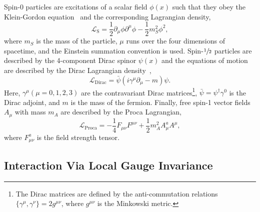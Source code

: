 Spin-0 particles are excitations of a scalar field $\phi(x)$ such that they obey the Klein-Gordon equation~\cite{Klein1926} and the corresponding Lagrangian density,
\begin{equation}
    \label{eq:scalar_lagrangian}
    \mathcal{L}_\text{S} = \frac{1}{2} \partial_\mu \phi \partial^\mu \phi - \frac{1}{2} m_S^2 \phi^2,
\end{equation}
where $m_S$ is the mass of the particle, $\mu$ runs over the four dimensions of spacetime, and the Einstein summation convention is used.
Spin-$\sfrac{1}{2}$ particles are described by the 4-component Dirac spinor $\psi(x)$ and the equations of motion are described by the Dirac Lagrangian density~\cite{Dirac1928},
\begin{equation}
    \label{eq:dirac_lagrangian}
    \mathcal{L}_\text{Dirac} = \bar{\psi} (i \gamma^\mu \partial_\mu - m) \psi.
\end{equation}
Here, $\gamma^\mu(\mu=0,1,2,3)$ are the contravariant Dirac matrices\footnote{The Dirac matrices are defined by the anti-commutation relations$\{ \gamma^\mu, \gamma^\nu \} = 2 g^{\mu\nu}$, where $g^{\mu\nu}$ is the Minkowski metric.}, $\bar{\psi} = \psi^\dagger \gamma^0$ is the Dirac adjoint, and $m$ is the mass of the fermion.
Finally, free spin-1 vector fields $A_\mu$ with mass $m_A$ are described by the Proca Lagrangian,
\begin{equation}
    \label{eq:proca_lagrangian}
    \mathcal{L}_\text{Proca} = -\frac{1}{4} F_{\mu\nu} F^{\mu\nu} + \frac{1}{2} m_A^2 A_\mu^a A^{\mu},
\end{equation}
where $F_{\mu\nu}^a$ is the field strength tensor.

\subsection{Interaction Via Local Gauge Invariance}
\label{sec:local_gauge_invariance}

